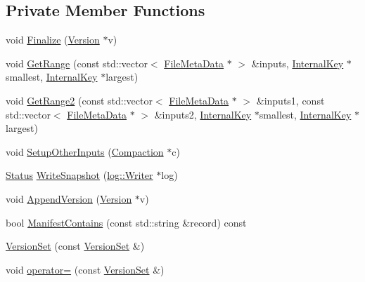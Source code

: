 \subsection*{Private Member Functions}
\begin{DoxyCompactItemize}
\item 
void \hyperlink{classleveldb_1_1_version_set_acea7aa4474cbf0efa6dbf21f3ef90d50}{Finalize} (\hyperlink{classleveldb_1_1_version}{Version} $\ast$v)
\item 
void \hyperlink{classleveldb_1_1_version_set_a4bba8e7761e985933a27ad44ec98f70d}{Get\-Range} (const std\-::vector$<$ \hyperlink{structleveldb_1_1_file_meta_data}{File\-Meta\-Data} $\ast$ $>$ \&inputs, \hyperlink{classleveldb_1_1_internal_key}{Internal\-Key} $\ast$smallest, \hyperlink{classleveldb_1_1_internal_key}{Internal\-Key} $\ast$largest)
\item 
void \hyperlink{classleveldb_1_1_version_set_a558c8e10dd7c19c0354cf2721560840b}{Get\-Range2} (const std\-::vector$<$ \hyperlink{structleveldb_1_1_file_meta_data}{File\-Meta\-Data} $\ast$ $>$ \&inputs1, const std\-::vector$<$ \hyperlink{structleveldb_1_1_file_meta_data}{File\-Meta\-Data} $\ast$ $>$ \&inputs2, \hyperlink{classleveldb_1_1_internal_key}{Internal\-Key} $\ast$smallest, \hyperlink{classleveldb_1_1_internal_key}{Internal\-Key} $\ast$largest)
\item 
void \hyperlink{classleveldb_1_1_version_set_aa9230d35e8bf13fc2f9b30f2a96f5c8a}{Setup\-Other\-Inputs} (\hyperlink{classleveldb_1_1_compaction}{Compaction} $\ast$c)
\item 
\hyperlink{classleveldb_1_1_status}{Status} \hyperlink{classleveldb_1_1_version_set_a0363416d0bee83bb1558837c1dd90830}{Write\-Snapshot} (\hyperlink{classleveldb_1_1log_1_1_writer}{log\-::\-Writer} $\ast$log)
\item 
void \hyperlink{classleveldb_1_1_version_set_aaed50532d8db6fe5941098c3462b24b8}{Append\-Version} (\hyperlink{classleveldb_1_1_version}{Version} $\ast$v)
\item 
bool \hyperlink{classleveldb_1_1_version_set_a3c18dccd157ff74f4f3a1dbe9ed35e8f}{Manifest\-Contains} (const std\-::string \&record) const 
\item 
\hyperlink{classleveldb_1_1_version_set_a0092350bf92a74ddff7b40faf2a3f214}{Version\-Set} (const \hyperlink{classleveldb_1_1_version_set}{Version\-Set} \&)
\item 
void \hyperlink{classleveldb_1_1_version_set_ad8bc71a204e00f1950ddaec6d3934877}{operator=} (const \hyperlink{classleveldb_1_1_version_set}{Version\-Set} \&)
\end{DoxyCompactItemize}

